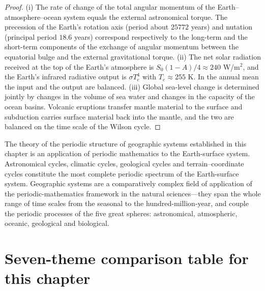 \begin{proof}
(i) The rate of change of the total angular momentum of the Earth--atmosphere--ocean system equals the external astronomical torque. The precession of the Earth's rotation axis (period about $25772$ years) and nutation (principal period $18.6$ years) correspond respectively to the long-term and the short-term components of the exchange of angular momentum between the equatorial bulge and the external gravitational torque.
(ii) The net solar radiation received at the top of the Earth's atmosphere is $S_0(1-A)/4\approx 240$ W/m$^2$, and the Earth's infrared radiative output is $\sigma T_e^4$ with $T_e\approx 255$ K. In the annual mean the input and the output are balanced.
(iii) Global sea-level change is determined jointly by changes in the volume of sea water and changes in the capacity of the ocean basins. Volcanic eruptions transfer mantle material to the surface and subduction carries surface material back into the mantle, and the two are balanced on the time scale of the Wilson cycle.
\end{proof}

\begin{remark}\label{rem:geo_book_interface}
The theory of the periodic structure of geographic systems established in this chapter is an application of periodic mathematics to the Earth-surface system. Astronomical cycles, climatic cycles, geological cycles and terrain--coordinate cycles constitute the most complete periodic spectrum of the Earth-surface system. Geographic systems are a comparatively complex field of application of the periodic-mathematics framework in the natural sciences---they span the whole range of time scales from the seasonal to the hundred-million-year, and couple the periodic processes of the five great spheres: astronomical, atmospheric, oceanic, geological and biological.
\end{remark}

\section*{Seven-theme comparison table for this chapter}

